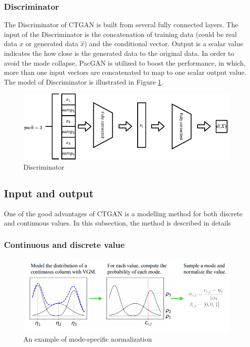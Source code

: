\documentclass{article}
\begin{document}
\subsubsection{Discriminator}

The Discriminator of \ac{CTGAN} is built from several fully connected layers. The input of the Discriminator is the concatenation of training data (could be real data $x$ or generated data $\hat{x}$) and the conditional vector. Output is a scalar value indicates the how close is the generated data to the original data. In order to avoid the mode collapse, \ac{PacGAN} is utilized to boost the performance, in which, more than one input vectors are concatenated to map to one scalar output value. The model of Discriminator is illustrated in Figure \ref{fig:dis}.

\begin{figure}[h]
	\centering
	\includegraphics[scale=0.4]{figures/dis.png}
	\caption{Discriminator}
	\label{fig:dis}
\end{figure}


\subsection{Input and output}\label{subsec:inout}

One of the good advantages of \ac{CTGAN} is a modelling method for both discrete and continuous values. In this subsection, the method is described in details

\subsubsection{Continuous and discrete value}

\begin{figure}[h]
	\centering
	\includegraphics[scale=0.5]{figures/conmix.png}
	\caption{An example of mode-specific normalization}
	\label{fig:conmix}
\end{figure}
\end{document}
